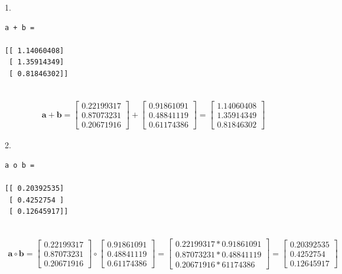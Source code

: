 \documentclass[10pt]{article}
\begin{document}
\begin{enumerate}
1.

\begin{verbatim}
a + b =

[[ 1.14060408]
 [ 1.35914349]
 [ 0.81846302]]
 
\end{verbatim}

\begin{eqnarray*}
\mathbf{a} + \mathbf{b} =
    \begin{bmatrix}
	0.22199317 \\[0.3em]
    0.87073231 \\[0.3em]
    0.20671916
    \end{bmatrix} +
    \begin{bmatrix}
	0.91861091 \\[0.3em]
    0.48841119 \\[0.3em]
    0.61174386
    \end{bmatrix} = 
    \begin{bmatrix}
	1.14060408 \\[0.3em]
    1.35914349 \\[0.3em]
    0.81846302
    \end{bmatrix}
\end{eqnarray*}

2.

\begin{verbatim}
a o b =

[[ 0.20392535]
 [ 0.4252754 ]
 [ 0.12645917]]
 
\end{verbatim}

\begin{eqnarray*}
\mathbf{a} \circ \mathbf{b} =
    \begin{bmatrix}
	0.22199317 \\[0.3em]
    0.87073231 \\[0.3em]
    0.20671916
    \end{bmatrix} \circ
    \begin{bmatrix}
	0.91861091 \\[0.3em]
    0.48841119 \\[0.3em]
    0.61174386
    \end{bmatrix} = 
	\begin{bmatrix}
	0.22199317 * 0.91861091 \\[0.3em]
    0.87073231 * 0.48841119 \\[0.3em]
    0.20671916 * 61174386
	\end{bmatrix} =
    \begin{bmatrix}
    0.20392535 \\[0.3em]
    0.4252754 \\[0.3em]
 	0.12645917
    \end{bmatrix}
\end{eqnarray*}


\end{enumerate}
\end{document}
